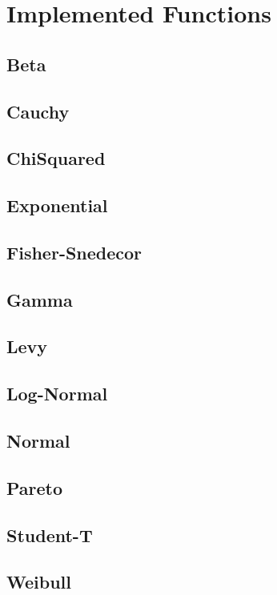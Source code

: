 
\chapter{Implemented Functions}

	\section{Beta}

	\section{Cauchy}

	\section{ChiSquared}

	\section{Exponential}

	\section{Fisher-Snedecor}

	\section{Gamma}

	\section{Levy}

	\section{Log-Normal}

	\section{Normal}

	\section{Pareto}

	\section{Student-T}

	\section{Weibull}